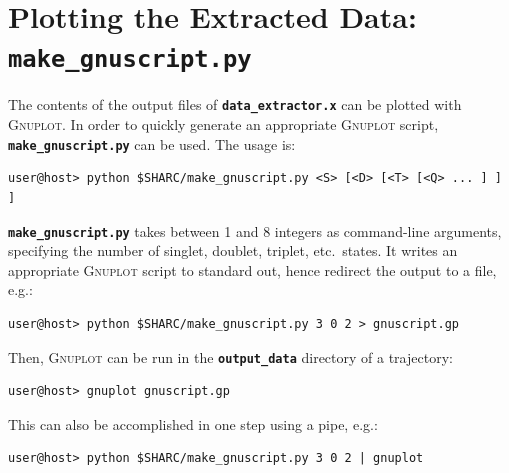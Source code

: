 \documentclass[a4paper,10pt,DIV=15,openany,twoside=false]{scrbook}
\newcommand{\ttt}[1]{\textbf{\texttt{#1}}}
\begin{document}
\section{Plotting the Extracted Data: \ttt{make\_gnuscript.py}}\label{sec:make_gnuscript.py}

The contents of the output files of \ttt{data\_extractor.x} can be plotted with \textsc{Gnuplot}. In order to quickly generate an appropriate \textsc{Gnuplot} script, \ttt{make\_gnuscript.py} can be used. The usage is:
\begin{verbatim}
user@host> python $SHARC/make_gnuscript.py <S> [<D> [<T> [<Q> ... ] ] ]
\end{verbatim}
\ttt{make\_gnuscript.py} takes between 1 and 8 integers as command-line arguments, specifying the number of singlet, doublet, triplet, etc.\ states. It writes an appropriate \textsc{Gnuplot} script to standard out, hence redirect the output to a file, e.g.:
\begin{verbatim}
user@host> python $SHARC/make_gnuscript.py 3 0 2 > gnuscript.gp
\end{verbatim}


Then, \textsc{Gnuplot} can be run in the \ttt{output\_data} directory of a trajectory:
\begin{verbatim}
user@host> gnuplot gnuscript.gp
\end{verbatim}
This can also be accomplished in one step using a pipe, e.g.:
\begin{verbatim}
user@host> python $SHARC/make_gnuscript.py 3 0 2 | gnuplot
\end{verbatim}
\end{document}
